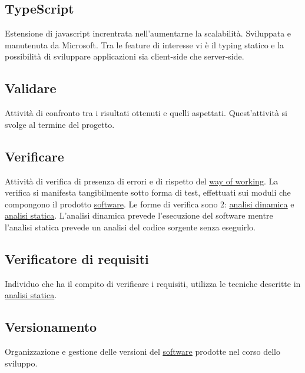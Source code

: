 	\subsection{TypeScript}
	\label{sec:typescript}
	Estensione di javascript increntrata nell'aumentarne la scalabilità. Sviluppata e manutenuta da Microsoft. Tra le feature di interesse vi è il typing statico e la possibilità di sviluppare applicazioni sia client-side che server-side.

	\newpage
	
	
	\subsection{Validare}
	\label{sec:validare}
	Attività di confronto tra i risultati ottenuti e quelli aspettati. Quest'attività si svolge al termine del progetto.

	
	\subsection{Verificare}
	\label{sec:verificare}
	Attività di verifica di presenza di errori e di rispetto del \underline{\hyperref[sec:wow]{way of working}}. La verifica si manifesta tangibilmente sotto forma di test, effettuati sui moduli che compongono il prodotto \underline{\hyperref[sec:prodottosoftware]{software}}. Le forme di verifica sono 2: \hyperref[sec:analisidinamica]{\underline{analisi dinamica}} e \hyperref[sec:analisistatica]{\underline{analisi statica}}. L'analisi dinamica prevede l'esecuzione del software mentre l'analisi statica prevede un analisi del codice sorgente senza eseguirlo.


	\subsection{Verificatore di requisiti}
	\label{sec:verificatorerequisiti}
	Individuo che ha il compito di verificare i requisiti, utilizza le tecniche descritte in \underline{\hyperref[sec:analisistatica]{analisi statica}}.

	
	\subsection{Versionamento}
	\label{sec:versionamento}
	Organizzazione e gestione delle versioni del \underline{\hyperref[sec:prodottosoftware]{software}} prodotte nel corso dello sviluppo.

